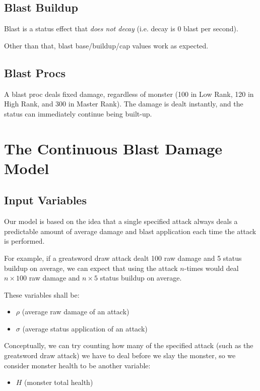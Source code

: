 \documentclass{article}
\begin{document}
\subsection{Blast Buildup}%
\label{sub:blast_buildup}

Blast is a status effect that \textit{does not decay} (i.e. decay is 0 blast per second).

Other than that, blast base/buildup/cap values work as expected.

\subsection{Blast Procs}%
\label{sub:blast_procs}

A blast proc deals fixed damage, regardless of monster (100 in Low Rank, 120 in High Rank, and 300 in Master Rank). The damage is dealt instantly, and the status can immediately continue being built-up.


\newpage


\section{The Continuous Blast Damage Model}%
\label{sec:the_continuous_blast_damage_model}


\subsection{Input Variables}%
\label{sub:input_variables}

Our model is based on the idea that a single specified attack always deals a predictable amount of average damage and blast application each time the attack is performed.

For example, if a greatsword draw attack dealt 100 raw damage and 5 status buildup on average, we can expect that using the attack $n$-times would deal $n \times 100$ raw damage and $n \times 5$ status buildup on average.

These variables shall be:
\begin{itemize}
    \item $\rho$ (average raw damage of an attack)
    \item $\sigma$ (average status application of an attack)
\end{itemize}

Conceptually, we can try counting how many of the specified attack (such as the greatsword draw attack) we have to deal before we slay the monster, so we consider monster health to be another variable:
\begin{itemize}
    \item $H$ (monster total health)
\end{itemize}
\end{document}
